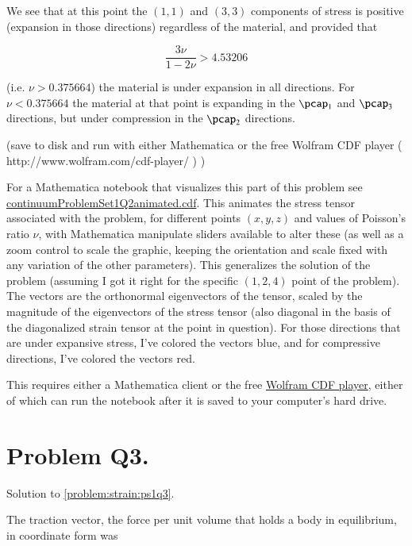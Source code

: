 We see that at this point the $(1,1)$ and $(3,3)$ components of stress is positive (expansion in those directions) regardless of the material, and provided that

\begin{equation}\label{eqn:continuumProblemSet1:390}
\frac{3 \nu}{1 - 2 \nu} > 4.53206
\end{equation}

(i.e. $\nu > 0.375664$) the material is under expansion in all directions.  For $\nu < 0.375664$ the material at that point is expanding in the $\pcap_1$ and $\pcap_3$ directions, but under compression in the $\pcap_2$ directions.

(save to disk and run with either Mathematica or the free Wolfram CDF player ( http://www.wolfram.com/cdf-player/  ) )

For a Mathematica notebook that visualizes this part of this problem see \href{https://raw.github.com/peeterjoot/physicsplay/master/notes/phy454/mathematica/continuumProblemSet1Q2animated.cdf}{continuumProblemSet1Q2animated.cdf}.  This animates the stress tensor associated with the problem, for different points $(x,y,z)$ and values of Poisson's ratio $\nu$, with Mathematica manipulate sliders available to alter these (as well as a zoom control to scale the graphic, keeping the orientation and scale fixed with any variation of the other parameters).  This generalizes the solution of the problem (assuming I got it right for the specific $(1,2,4)$ point of the problem).  The vectors are the orthonormal eigenvectors of the tensor, scaled by the magnitude of the eigenvectors of the stress tensor (also diagonal in the basis of the diagonalized strain tensor at the point in question).  For those directions that are under expansive stress, I've colored the vectors blue, and for compressive directions, I've colored the vectors red.

This requires either a Mathematica client or the free \href{http://www.wolfram.com/cdf-player/}{Wolfram CDF player}, either of which can run the notebook after it is saved to your computer's hard drive.

\label{solutions:ps1q3}
\section{Problem Q3.}

Solution to \ref{problem:strain:ps1q3}.

The traction vector, the force per unit volume that holds a body in equilibrium, in coordinate form was


